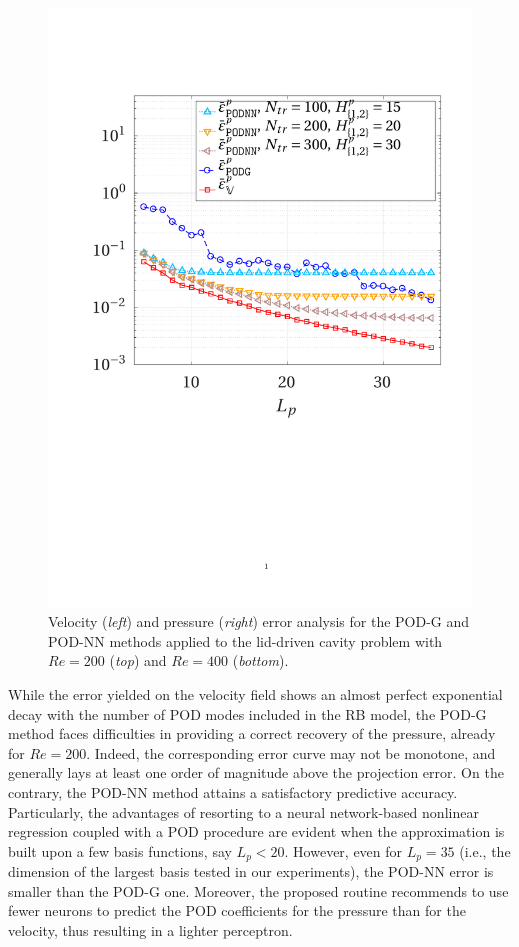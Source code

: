 \documentclass{elsarticle}
\numberwithin{equation}{section}
\theoremstyle{theorem}
\theoremstyle{definition}
\theoremstyle{remark}
\theoremstyle{proposition}
\numberwithin{figure}{section}
\begin{document}
\begin{figure}[t!]
			\includegraphics[scale = 0.4, trim = {2cm 9cm 1.5cm 3.5cm}, clip]{dc_400_p_error_vs_rank}
			
			\caption{Velocity (\emph{left}) and pressure (\emph{right}) error analysis for the POD-G and POD-NN methods applied to the lid-driven cavity problem with $Re = 200$ (\emph{top}) and $Re = 400$ (\emph{bottom}).}
			\label{fig:dc-error-vs-rank}
		\end{figure}
									
		While the error yielded on the velocity field shows an almost perfect exponential decay with the number of POD modes included in the RB model, the POD-G method faces difficulties in providing a correct recovery of the pressure, already for $Re = 200$. Indeed, the corresponding error curve may not be monotone, and generally lays at least one order of magnitude above the projection error. On the contrary, the POD-NN method attains a satisfactory predictive accuracy. Particularly, the advantages of resorting to a neural network-based nonlinear regression coupled with a POD procedure are evident when the approximation is built upon a few basis functions, say $L_p < 20$. However, even for $L_p = 35$ (i.e., the dimension of the largest basis tested in our experiments), the POD-NN error is smaller than the POD-G one. Moreover, the proposed routine recommends to use fewer neurons to predict the POD coefficients for the pressure than for the velocity, thus resulting in a lighter perceptron. 
		
\end{document}
